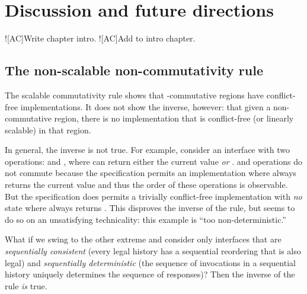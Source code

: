 \section{Discussion and future directions}
\label{sec:future-work}


\XXX![AC]{Write chapter intro.}
\XXX![AC]{Add to intro chapter.}




\subsection{The non-scalable non-commutativity rule}


The scalable commutativity rule shows that \SIM-commutative regions
have conflict-free implementations.
%
It does not show the inverse, however: that given a non-commutative
region, there is no implementation that is conflict-free (or linearly
scalable) in that region.

In general, the inverse is not true.
%
For example, consider an interface with two operations:
 and , where  can return either
the current value \emph{or} .   and
 operations do not \SIM commute because the specification
permits an implementation where  always returns the current
value and thus the order of these operations is observable.  But the
specification does permits a trivially conflict-free implementation
with \emph{no} state where  always returns .
%
This disproves the inverse of the rule, but seems to do so on an
unsatisfying technicality: this example is ``too non-deterministic.''
%

What if we swing to the other extreme and consider only interfaces
that are \emph{sequentially consistent} (every legal history has a
sequential reordering that is also legal) and \emph{sequentially
  deterministic} (the sequence of invocations in a sequential history
uniquely determines the sequence of responses)?  Then the inverse of
the rule \emph{is} true.
%

